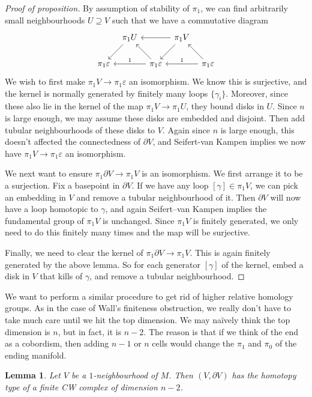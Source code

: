 \documentclass[a4paper, 12pt]{article}
\newtheorem{lemma}[thm]{Lemma}
\theoremstyle{definition}
\begin{document}
\begin{proof}[Proof of proposition]
  By assumption of stability of $\pi_1$, we can find arbitrarily small neighbourhoods $U \supseteq V$ such that we have a commutative diagram
  \[
    \begin{tikzcd}[column sep=tiny]
      & \pi_1 U \ar[ld] & & \pi_1 V \ar[ld] \ar[ll]\\
      \pi_1 \varepsilon & & \pi_1 \varepsilon \ar[ll, "1"'] \ar[ul] & & \pi_1 \varepsilon \ar[ll, "1"'] \ar[ul]
    \end{tikzcd}
  \]
  We wish to first make $\pi_1 V \to \pi_1 \varepsilon$ an isomorphism. We know this is surjective, and the kernel is normally generated by finitely many loops $\{\gamma_i\}$. Moreover, since these also lie in the kernel of the map $\pi_1 V \to \pi_1 U$, they bound disks in $U$. Since $n$ is large enough, we may assume these disks are embedded and disjoint. Then add tubular neighbourhoods of these disks to $V$. Again since $n$ is large enough, this doesn't affected the connectedness of $\partial V$, and Seifert-van Kampen implies we now have $\pi_1 V \to \pi_1 \varepsilon$ an isomorphism.

  We next want to ensure $\pi_1 \partial V \to \pi_1 V$ is an isomorphism. We first arrange it to be a surjection. Fix a basepoint in $\partial V$. If we have any loop $[\gamma] \in \pi_1 V$, we can pick an embedding in $V$ and remove a tubular neighbourhood of it. Then $\partial V$ will now have a loop homotopic to $\gamma$, and again Seifert--van Kampen implies the fundamental group of $\pi_1V$ is unchanged. Since $\pi_1 V$ is finitely generated, we only need to do this finitely many times and the map will be surjective.

  Finally, we need to clear the kernel of $\pi_1 \partial V \to \pi_1 V$. This is again finitely generated by the above lemma. So for each generator $[\gamma]$ of the kernel, embed a disk in $V$ that kills of $\gamma$, and remove a tubular neighbourhood.
\end{proof}
We want to perform a similar procedure to get rid of higher relative homology groups. As in the case of Wall's finiteness obstruction, we really don't have to take much care until we hit the top dimension. We may na\"ively think the top dimension is $n$, but in fact, it is $n - 2$. The reason is that if we think of the end as a cobordism, then adding $n - 1$ or $n$ cells would change the $\pi_1$ and $\pi_0$ of the ending manifold.

\begin{lemma}
  Let $V$ be a $1$-neighbourhood of $M$. Then $(V, \partial V)$ has the homotopy type of a finite CW complex of dimension $n - 2$.
\end{lemma}
\end{document}
